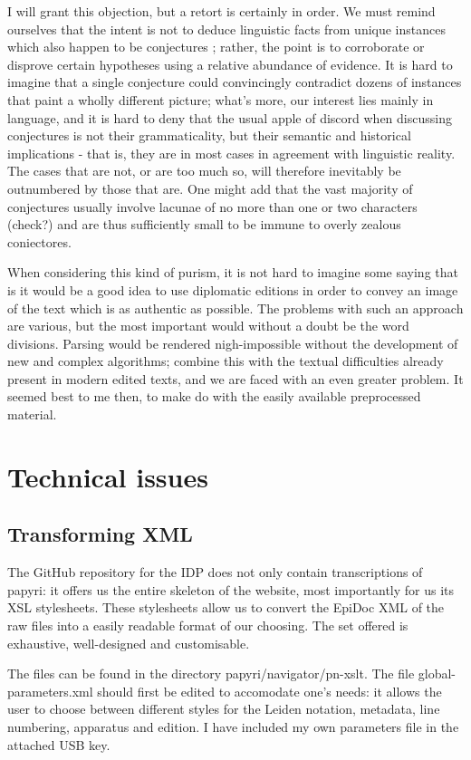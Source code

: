 I will grant this objection, but a retort is certainly in order. We must remind
ourselves that the intent is not to deduce linguistic facts from unique
instances which also happen to be conjectures ; rather, the point is to
corroborate or disprove certain hypotheses using a relative abundance of
evidence. It is hard to imagine that a single conjecture could convincingly
contradict dozens of instances that paint a wholly different picture; what's
more, our interest lies mainly in language, and it is hard to deny that the
usual apple of discord when discussing conjectures is not their grammaticality,
but their semantic and historical implications - that is, they are in most
cases in agreement with linguistic reality. The cases that are not, or are too
much so, will therefore inevitably be outnumbered by those that are. One might
add that the vast majority of conjectures usually involve lacunae of no more
than one or two characters (check?) and are thus sufficiently small to be
immune to overly zealous coniectores.

When considering this kind of purism, it is not hard to imagine some saying
that is it would be a good idea to use diplomatic editions in order to convey
an image of the text which is as authentic as possible.  The problems with such
an approach are various, but the most important would without a doubt be the
word divisions. Parsing would be rendered nigh-impossible without the
development of new and complex algorithms; combine this with the textual
difficulties already present in modern edited texts, and we are faced with an
even greater problem. It seemed best to me then, to make do with the easily
available preprocessed material.
\section{Technical issues}
\label{subsect:techissues}
\subsection{Transforming XML}
\label{subsect:xslt}
The GitHub repository for the IDP does not only contain transcriptions
of papyri: it offers us the entire skeleton of the website, most
importantly for us its XSL stylesheets. These stylesheets allow us to
convert the EpiDoc XML of the raw files into a easily readable format of
our choosing. The set offered is exhaustive, well-designed and
customisable.

The files can be found in the directory papyri/navigator/pn-xslt. The
file global-parameters.xml should first be edited to accomodate one's
needs: it allows the user to choose between different styles for the
Leiden notation, metadata, line numbering, apparatus and edition. I have
included my own parameters file in the attached USB key.

